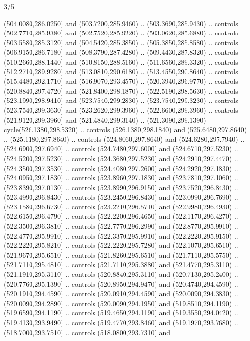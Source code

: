 \begin{flagdescription}{3/5}
\begin{scope}[shift={(0.5\flaglength,0.5\flagwidth)},scale=\flagwidth/1075]
\begin{scope}[y=0.80pt, x=0.80pt, yscale=-2.37, xscale=2.37,xshift=-402,yshift=-230.4]
  (504.0080,286.0250) and (503.7200,285.9460) .. (503.3690,285.9430) .. controls
  (502.7710,285.9380) and (502.7520,285.9220) .. (503.0620,285.6880) .. controls
  (503.5580,285.3120) and (504.5420,285.3850) .. (505.3850,285.8580) .. controls
  (506.9150,286.7180) and (508.3790,287.4280) .. (509.4430,287.8320) .. controls
  (510.2660,288.1440) and (510.8150,288.5160) .. (511.6560,289.3320) .. controls
  (512.2710,289.9280) and (513.0810,290.6180) .. (513.4550,290.8640) .. controls
  (515.4480,292.1710) and (516.9070,293.4570) .. (520.3940,296.9770) .. controls
  (520.8840,297.4720) and (521.8400,298.1870) .. (522.5190,298.5630) .. controls
  (523.1990,298.9410) and (523.7540,299.2830) .. (523.7540,299.3230) .. controls
  (523.7540,299.3630) and (523.2620,299.3960) .. (522.6600,299.3960) .. controls
  (521.9120,299.3960) and (521.4840,299.3140) .. (521.3090,299.1390) --
  cycle(526.1380,298.5320) .. controls (526.1380,298.1840) and
  (525.6480,297.8640) .. (525.1180,297.8640) .. controls (524.8060,297.8640) and
  (524.6280,297.7940) .. (524.6900,297.6940) .. controls (524.7480,297.6000) and
  (524.6710,297.5230) .. (524.5200,297.5230) .. controls (524.3680,297.5230) and
  (524.2910,297.4470) .. (524.3500,297.3530) .. controls (524.4080,297.2600) and
  (524.2920,297.1830) .. (524.0950,297.1830) .. controls (523.8960,297.1830) and
  (523.7810,297.1060) .. (523.8390,297.0130) .. controls (523.8990,296.9150) and
  (523.7520,296.8430) .. (523.4990,296.8430) .. controls (523.2450,296.8430) and
  (523.0990,296.7690) .. (523.1580,296.6730) .. controls (523.2210,296.5710) and
  (522.9980,296.4930) .. (522.6150,296.4790) .. controls (522.2200,296.4650) and
  (522.1170,296.4270) .. (522.3500,296.3810) .. controls (522.7770,296.2990) and
  (522.8770,295.9910) .. (522.4770,295.9910) .. controls (522.3370,295.9910) and
  (522.2220,295.9150) .. (522.2220,295.8210) .. controls (522.2220,295.7280) and
  (522.1070,295.6510) .. (521.9670,295.6510) .. controls (521.8260,295.6510) and
  (521.7110,295.5750) .. (521.7110,295.4810) .. controls (521.7110,295.3880) and
  (521.4770,295.3110) .. (521.1910,295.3110) .. controls (520.8840,295.3110) and
  (520.7130,295.2400) .. (520.7760,295.1390) .. controls (520.8950,294.9470) and
  (520.4740,294.4590) .. (520.1910,294.4590) .. controls (520.0910,294.4590) and
  (520.0090,294.3830) .. (520.0090,294.2890) .. controls (520.0090,294.1950) and
  (519.8510,294.1190) .. (519.6590,294.1190) .. controls (519.4650,294.1190) and
  (519.3550,294.0420) .. (519.4130,293.9490) .. controls (519.4770,293.8460) and
  (519.1970,293.7680) .. (518.7000,293.7510) .. controls (518.0800,293.7310) and

\end{scope}
\end{scope}
\end{flagdescription}
